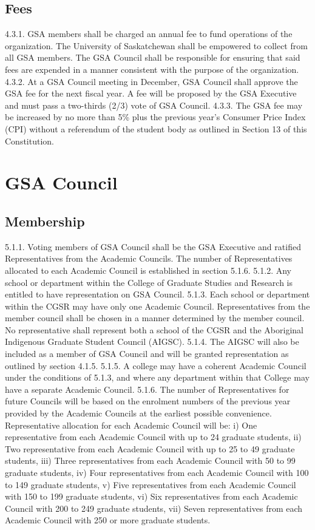\documentclass{article}
\begin{document}
\subsection{Fees }
4.3.1. GSA members shall be charged an annual fee to fund operations of the 
organization. The University of Saskatchewan shall be empowered to 
collect from all GSA members. The GSA Council shall be responsible 
for ensuring that said fees are expended in a manner consistent with 
the purpose of the organization. 
4.3.2. At a GSA Council meeting in December, GSA Council shall approve 
the GSA fee for the next fiscal year. A fee will be proposed by the 
GSA Executive and must pass a two-thirds (2/3) vote of GSA Council. 
4.3.3. The GSA fee may be increased by no more than 5\% plus the previous 
year’s Consumer Price Index (CPI) without a referendum of the 
student body as outlined in Section 13 of this Constitution. 
\section{GSA Council }
\subsection{Membership }
5.1.1. Voting members of GSA Council shall be the GSA Executive and 
ratified Representatives from the Academic Councils. The number of 
Representatives allocated to each Academic Council is established in 
section 5.1.6. 
5.1.2. Any school or department within the College of Graduate Studies and 
Research is entitled to have representation on GSA Council. 
5.1.3. Each school or department within the CGSR may have only one 
Academic Council. Representatives from the member council shall be 
chosen in a manner determined by the member council. No 
representative shall represent both a school of the CGSR and the 
Aboriginal Indigenous Graduate Student Council (AIGSC). 
5.1.4. The AIGSC will also be included as a member of GSA Council and 
will be granted representation as outlined by section 4.1.5. 
5.1.5. A college may have a coherent Academic Council under the conditions 
of 5.1.3, and where any department within that College may have a 
separate Academic Council. 
5.1.6. The number of Representatives for future Councils will be based on 
the enrolment numbers of the previous year provided by the Academic 
Councils at the earliest possible convenience. Representative allocation for each Academic Council will be: 
i) One representative from each Academic Council with up to 24 
graduate students, 
ii) Two representative from each Academic Council with up to 25 to 49 
graduate students, 
iii) Three representatives from each Academic Council with 50 to 99 
graduate students, 
iv) Four representatives from each Academic Council with 100 to 149 
graduate students, 
v) Five representatives from each Academic Council with 150 to 199 
graduate students, 
vi) Six representatives from each Academic Council with 200 to 249 
graduate students, 
vii) Seven representatives from each Academic Council with 250 or more 
graduate students. 
\end{document}
